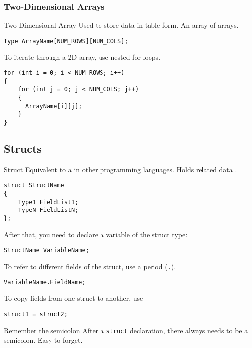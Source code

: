 \documentclass[\main/notes.tex]{subfiles}
\begin{document}
				\subsubsection*{Two-Dimensional Arrays}
					\begin{definition}{Two-Dimensional Array}
						Used to store data in table form. An array of arrays.
						\begin{verbatim}
Type ArrayName[NUM_ROWS][NUM_COLS];
						\end{verbatim}
						To iterate through a 2D array, use nested for loops.
						\begin{verbatim}
for (int i = 0; i < NUM_ROWS; i++)
{
    for (int j = 0; j < NUM_COLS; j++)
    {
      ArrayName[i][j];
    }
}
						\end{verbatim}
					\end{definition}

			\subsection*{Structs}
					\begin{definition}{Struct}
						Equivalent to a  in other programming languages. Holds related data .
						\begin{verbatim}
struct StructName
{
    Type1 FieldList1;
    TypeN FieldListN;
};
						\end{verbatim}
						After that, you need to declare a variable of the struct type:
						\begin{verbatim}
StructName VariableName;
						\end{verbatim}
						To refer to different fields of the struct, use a period (\texttt{.}).
						\begin{verbatim}
VariableName.FieldName;
						\end{verbatim}
						To copy fields from one struct to another, use
						\begin{verbatim}
struct1 = struct2;
						\end{verbatim}
					\end{definition}
					\begin{sidenote}{Remember the semicolon}
						After a \texttt{struct} declaration, there always needs to be a semicolon. Easy to forget.
					\end{sidenote}
\end{document}
